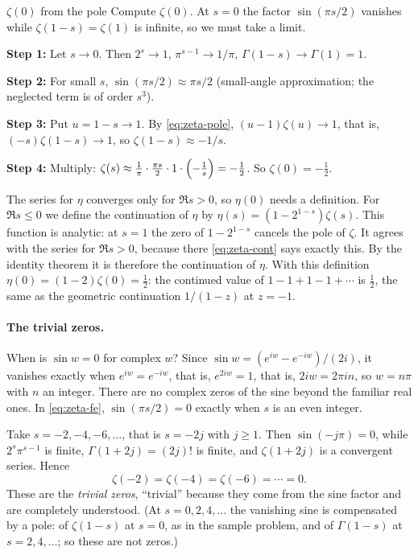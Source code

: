 \begin{sample}{$\zeta(0)$ from the pole}
Compute $\zeta(0)$. At $s=0$ the factor $\sin(\pi s/2)$ vanishes while $\zeta(1-s)=\zeta(1)$ is infinite, so we must take a limit.

\textbf{Step 1:} Let $s\to0$. Then $2^s\to1$, $\pi^{s-1}\to1/\pi$, $\Gamma(1-s)\to\Gamma(1)=1$.

\textbf{Step 2:} For small $s$, $\sin(\pi s/2)\approx\pi s/2$ (small-angle approximation; the neglected term is of order $s^3$).

\textbf{Step 3:} Put $u=1-s\to1$. By \cref{eq:zeta-pole}, $(u-1)\zeta(u)\to1$, that is, $(-s)\zeta(1-s)\to1$, so $\zeta(1-s)\approx-1/s$.

\textbf{Step 4:} Multiply: $\zeta(s)\approx\frac1\pi\cdot\frac{\pi s}{2}\cdot1\cdot\Bigl(-\frac1s\Bigr)=-\frac12$. So $\boxed{\zeta(0)=-\tfrac12.}$

The series for $\eta$ converges only for $\Re s>0$, so $\eta(0)$ needs a definition. For $\Re s\le0$ we define the continuation of $\eta$ by $\eta(s)=(1-2^{1-s})\zeta(s)$. This function is analytic: at $s=1$ the zero of $1-2^{1-s}$ cancels the pole of $\zeta$. It agrees with the series for $\Re s>0$, because there \cref{eq:zeta-cont} says exactly this. By the identity theorem it is therefore the continuation of $\eta$. With this definition $\eta(0)=(1-2)\zeta(0)=\tfrac12$: the continued value of $1-1+1-1+\cdots$ is $\tfrac12$, the same as the geometric continuation $1/(1-z)$ at $z=-1$.
\end{sample}

\paragraph{The trivial zeros.} When is $\sin w=0$ for complex $w$? Since $\sin w=(e^{iw}-e^{-iw})/(2i)$, it vanishes exactly when $e^{iw}=e^{-iw}$, that is, $e^{2iw}=1$, that is, $2iw=2\pi i n$, so $w=n\pi$ with $n$ an integer. There are no complex zeros of the sine beyond the familiar real ones. In \cref{eq:zeta-fe}, $\sin(\pi s/2)=0$ exactly when $s$ is an even integer.

Take $s=-2,-4,-6,\dots$, that is $s=-2j$ with $j\ge1$. Then $\sin(-j\pi)=0$, while $2^s\pi^{s-1}$ is finite, $\Gamma(1+2j)=(2j)!$ is finite, and $\zeta(1+2j)$ is a convergent series. Hence
\[
\zeta(-2)=\zeta(-4)=\zeta(-6)=\cdots=0.
\]
These are the \emph{trivial zeros}, ``trivial'' because they come from the sine factor and are completely understood. (At $s=0,2,4,\dots$ the vanishing sine is compensated by a pole: of $\zeta(1-s)$ at $s=0$, as in the sample problem, and of $\Gamma(1-s)$ at $s=2,4,\dots$; so these are not zeros.)

